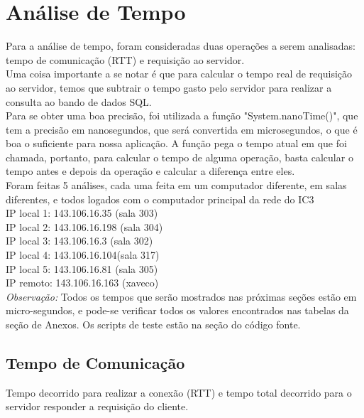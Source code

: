 \documentclass[11pt,twoside]{article}
\begin{document}
\section{Análise de Tempo}
Para a análise de tempo, foram consideradas duas operações a serem analisadas: tempo de comunicação (RTT) e requisição ao servidor.\\
Uma coisa importante a se notar é que para calcular o tempo real de requisição ao servidor, temos que subtrair o tempo gasto pelo servidor para realizar a consulta ao bando de dados SQL.\\
Para se obter uma boa precisão, foi utilizada a função "System.nanoTime()", que tem a precisão em nanosegundos, que será convertida em microsegundos, o que é boa o suficiente para nossa aplicação. A função pega o tempo atual em que foi chamada, portanto, para calcular o tempo de alguma operação, basta calcular o tempo antes e depois da operação e calcular a diferença entre eles.\\
Foram feitas 5 análises, cada uma feita em um computador diferente, em salas diferentes, e todos logados com o computador principal da rede do IC3\\
IP local 1: 143.106.16.35 (sala 303)\\
IP local 2: 143.106.16.198 (sala 304)\\
IP local 3: 143.106.16.3 (sala 302)\\
IP local 4: 143.106.16.104(sala 317)\\
IP local 5: 143.106.16.81 (sala 305)\\
IP remoto: 143.106.16.163 (xaveco)\\

\textit{Observação: }Todos os tempos que serão mostrados nas próximas seções estão em micro-segundos, e pode-se verificar todos os valores encontrados nas tabelas da seção de Anexos. Os scripts de teste estão na seção do código fonte.\\

\subsection{Tempo de Comunicação}
Tempo decorrido para realizar a conexão (RTT) e tempo total decorrido para o servidor responder a requisição do cliente.\\
\end{document}
